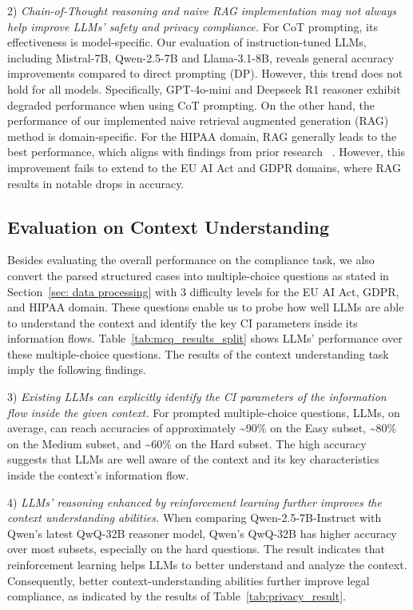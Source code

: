 2) \textit{Chain-of-Thought reasoning and naive RAG implementation may not always help improve LLMs' safety and privacy compliance.}
For CoT prompting, its effectiveness is model-specific.
Our evaluation of instruction-tuned LLMs, including Mistral-7B, Qwen-2.5-7B and Llama-3.1-8B, reveals general accuracy improvements compared to direct prompting (DP).
However, this trend does not hold for all models.
Specifically, GPT-4o-mini and Deepseek R1 reasoner exhibit degraded performance when using CoT prompting.
On the other hand, the performance of our implemented naive retrieval augmented generation (RAG) method is domain-specific.
For the HIPAA domain, RAG generally leads to the best performance, which aligns with findings from prior research ~\cite{li-2024-privacychecklist}.
However, this improvement fails to extend to the EU AI Act and GDPR domains, where RAG results in notable drops in accuracy.





\subsection{Evaluation on Context Understanding}

Besides evaluating the overall performance on the compliance task, we also convert the parsed structured cases into multiple-choice questions as stated in Section~\ref{sec: data processing} with 3 difficulty levels for the EU AI Act, GDPR, and HIPAA domain.
These questions enable us to probe how well LLMs are able to understand the context and identify the key CI parameters inside its information flows.
Table~\ref{tab:mcq_results_split} shows LLMs' performance over these multiple-choice questions.
The results of the context understanding task imply the following findings.


3) \textit{Existing LLMs can explicitly identify the CI parameters of the information flow inside the given context.}
For prompted multiple-choice questions, LLMs, on average, can reach accuracies of approximately \textasciitilde 90\% on the Easy subset, \textasciitilde 80\% on the Medium subset, and \textasciitilde 60\% on the Hard subset.
The high accuracy suggests that LLMs are well aware of the context and its key characteristics inside the context's information flow.


4) \textit{LLMs' reasoning enhanced by reinforcement learning further improves the context understanding abilities.}
When comparing Qwen-2.5-7B-Instruct with Qwen's latest QwQ-32B reasoner model, Qwen's QwQ-32B has higher accuracy over most subsets, especially on the hard questions.
The result indicates that reinforcement learning helps LLMs to better understand and analyze the context.
Consequently, better context-understanding abilities further improve legal compliance, as indicated by the results of Table~\ref{tab:privacy_result}.

